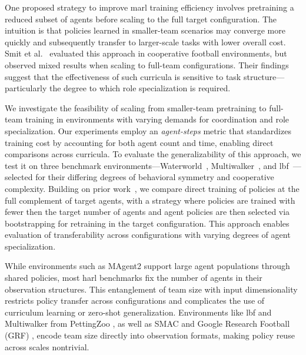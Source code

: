 \documentclass{article}
\begin{document}
One proposed strategy to improve \gls{marl} training efficiency involves pretraining 
a reduced subset of agents before scaling to the full target configuration. 
The intuition is that policies learned in smaller-team scenarios may converge 
more quickly and subsequently transfer to larger-scale tasks with lower overall cost. 
Smit et al.~\cite{smit2023} evaluated this approach in cooperative football environments, 
but observed mixed results when scaling to full-team configurations. Their findings 
suggest that the effectiveness of such curricula is sensitive to task structure—particularly 
the degree to which role specialization is required.

We investigate the feasibility of scaling from smaller-team pretraining to full-team 
training in environments with varying demands for coordination and role specialization.
Our experiments employ an \emph{agent-steps} metric that standardizes training cost by 
accounting for both agent count and time, enabling direct comparisons across curricula. 
To evaluate the generalizability of this approach, we test it on three benchmark 
environments—Waterworld~\cite{gupta2017}, Multiwalker~\cite{gupta2017}, 
and \gls{lbf}~\cite{papoudakis2021}—selected for their 
differing degrees of behavioral symmetry and cooperative complexity. 
Building on prior work~\cite{smit2023}, we compare 
direct training of policies at the full complement of target agents, with a strategy 
where policies are trained with fewer then the target number of agents and agent 
policies are then selected via bootstrapping for retraining in the target configuration.
This approach enables evaluation of transferability across configurations with 
varying degrees of agent specialization.

While environments such as MAgent2 \cite{zheng2017} support large agent populations through 
shared policies, most \gls{harl} benchmarks fix the number of agents in their observation structures. 
This entanglement of team size with input dimensionality restricts policy transfer across 
configurations and complicates the use of curriculum learning or zero-shot generalization. 
Environments like \gls{lbf} and Multiwalker from PettingZoo \cite{terry2021}, as well as 
SMAC \cite{samvelyan2019} and Google Research Football (GRF) \cite{kurach2020}, 
encode team size directly into observation formats, making policy reuse across scales nontrivial.
\end{document}
